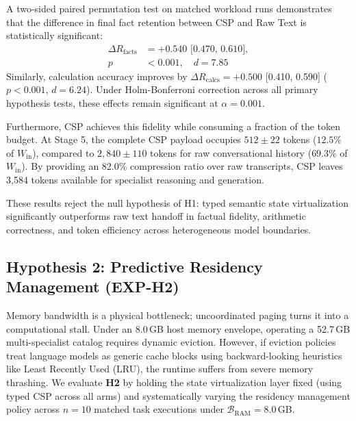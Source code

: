 A two-sided paired permutation test on matched workload runs demonstrates that the difference in final fact retention between CSP and Raw Text is statistically significant:
\begin{equation}
\begin{aligned}
\Delta R_{\text{facts}} &= +0.540 \text{ [0.470, 0.610]}, \\
p &< 0.001, \quad d = 7.85
\end{aligned}
\end{equation}
Similarly, calculation accuracy improves by $\Delta R_{\text{calcs}} = +0.500$ [0.410, 0.590] ($p < 0.001$, $d = 6.24$). Under Holm-Bonferroni correction across all primary hypothesis tests, these effects remain significant at $\alpha = 0.001$.

Furthermore, CSP achieves this fidelity while consuming a fraction of the token budget. At Stage 5, the complete CSP payload occupies $512 \pm 22$ tokens ($12.5\%$ of $W_{\text{in}}$), compared to $2,840 \pm 110$ tokens for raw conversational history ($69.3\%$ of $W_{\text{in}}$). By providing an 82.0\% compression ratio over raw transcripts, CSP leaves 3,584 tokens available for specialist reasoning and generation.

These results reject the null hypothesis of H1: typed semantic state virtualization significantly outperforms raw text handoff in factual fidelity, arithmetic correctness, and token efficiency across heterogeneous model boundaries.

\subsection{Hypothesis 2: Predictive Residency Management (EXP-H2)}
\label{sec:results_h2}

Memory bandwidth is a physical bottleneck; uncoordinated paging turns it into a computational stall. Under an 8.0\,GB host memory envelope, operating a 52.7\,GB multi-specialist catalog requires dynamic eviction. However, if eviction policies treat language models as generic cache blocks using backward-looking heuristics like Least Recently Used (LRU), the runtime suffers from severe memory thrashing. We evaluate \textbf{H2} by holding the state virtualization layer fixed (using typed CSP across all arms) and systematically varying the residency management policy across $n=10$ matched task executions under $\mathcal{B}_{\text{RAM}} = 8.0$\,GB.

